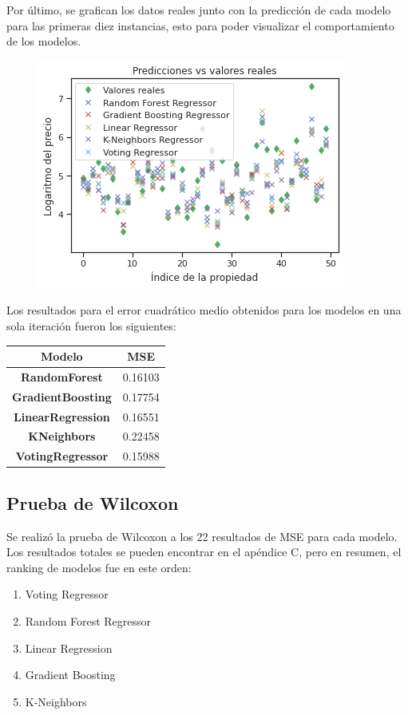 \documentclass[sigconf,authorversion,nonacm]{acmart}
\begin{document}
Por último, se grafican los datos reales junto con la predicción de cada modelo para las primeras diez instancias, esto para poder visualizar el comportamiento de los modelos.

\begin{figure}[H]
  \centering
  \includegraphics[width=\linewidth]{grafica_resultados.png}
\end{figure}

Los resultados para el error cuadrático medio obtenidos para los modelos en una sola iteración fueron los siguientes:

\begin{table}[]
\begin{tabular}{|c|c|}
\hline
\textbf{Modelo}           & \textbf{MSE} \\ \hline
\textbf{RandomForest}     & 0.16103      \\ \hline
\textbf{GradientBoosting} & 0.17754      \\ \hline
\textbf{LinearRegression} & 0.16551      \\ \hline
\textbf{KNeighbors}       & 0.22458      \\ \hline
\textbf{VotingRegressor}  & 0.15988      \\ \hline
\end{tabular}
\end{table}

\subsection{Prueba de Wilcoxon}
Se realizó la prueba de Wilcoxon a los 22 resultados de MSE para cada modelo. Los resultados totales se pueden encontrar en el apéndice C, pero en resumen, el ranking de modelos fue en este orden:
\begin{enumerate}
  \item Voting Regressor
  \item Random Forest Regressor
  \item Linear Regression
  \item Gradient Boosting
  \item K-Neighbors
\end{enumerate}
\end{document}
